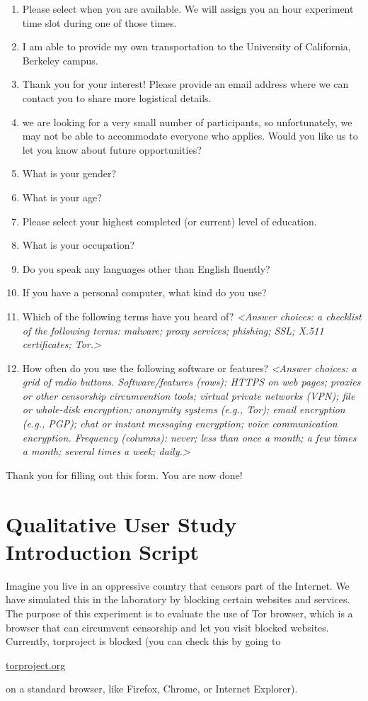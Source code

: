 \documentclass[USenglish,oneside,twocolumn]{article}
\begin{document}
\begin{enumerate}
\item{Please select when you are available. We will assign you an hour experiment time slot during one of those times.}
\item{I am able to provide my own transportation to the University of California, Berkeley 
campus.}
\item{Thank you for your interest! Please provide an email address where we can contact you to share more logistical details.}
\item{we are looking for a very small number of participants, so unfortunately, we may not be able to accommodate everyone who applies. Would you like us to let you know about future opportunities?}
\item{What is your gender?}
\item{What is your age?}
\item{Please select your highest completed (or current) level of education.}
\item{What is your occupation?} 
\item{Do you speak any languages other than English fluently?}
\item{If you have a personal computer, what kind do you use?}
\item{Which of the following terms have you heard of? \textit{<Answer choices: a checklist of the following terms: malware; proxy services; phishing; SSL; X.511 certificates; Tor.>}}
\item{How often do you use the following software or features? \textit{<Answer choices: a grid of radio buttons. Software/features (rows): HTTPS on web pages; proxies or other censorship circumvention tools; virtual private networks (VPN); file or whole-disk encryption; anonymity systems (e.g., Tor); email encryption (e.g., PGP); chat or instant messaging encryption; voice communication encryption. Frequency (columns): never; less than once a month; a few times a month; several times a week; daily.>}}
\end{enumerate}
Thank you for filling out this form. You are now done!

\section{Qualitative User Study Introduction Script} 
\label{qualitative-script} 
Imagine you live in an oppressive country that censors part of the Internet. We have simulated this in the laboratory by blocking certain websites and services.  The purpose of this experiment is to evaluate the use of Tor browser, which is a browser that can circumvent censorship and let you visit blocked websites. Currently, torproject is blocked (you can check this by going to \begin{NoHyper}\url{torproject.org}\end{NoHyper} on a standard browser, like Firefox, Chrome, or Internet Explorer). 
\end{document}
